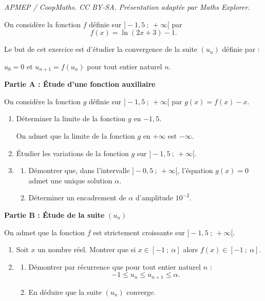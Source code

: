 \documentclass[10pt]{article}
\begin{document}
\noindent\textit{APMEP / CoopMaths. CC BY-SA. Présentation adaptée par Maths Explorer.}\par\medskip
\medskip

On considère la fonction $f$ définie sur $]-1,5~;~ +\infty[$ par 
\[f(x) = \ln (2x + 3) - 1.\]

Le but de cet exercice est d'étudier la convergence de la suite $\left(u_n\right)$ définie par  :
\begin{center}
$u_0 = 0$ et $u_{n+1}  = f\left(u_n\right)$ pour tout entier naturel $n$.\end{center}

\bigskip

\textbf{Partie A : Étude d'une fonction auxiliaire}

\medskip

On considère la fonction $g$ définie sur $]-1,5~;~ +\infty[$ par $g(x) = f(x) - x$.

\medskip

\begin{enumerate}
\item Déterminer la limite de la fonction $g$ en $-1,5$.

On admet que la limite de la fonction $g$ en $+ \infty$ est $-\infty$.

\item Étudier les variations de la fonction $g$ sur $]-1,5~;~ +\infty[$.
\item 
	\begin{enumerate}
		\item Démontrer que, dans l'intervalle $]-0,5~;~ +\infty[$, l'équation $g(x) = 0$ admet une unique solution $\alpha$.
		\item Déterminer un encadrement de $\alpha$ d'amplitude $10^{-2}$.
	\end{enumerate}	
\end{enumerate}

\bigskip

\textbf{Partie B : Étude de la suite} \boldmath $\left(u_n\right)$\unboldmath

\medskip

On admet que la fonction $f$ est strictement croissante sur $]-1,5~;~ +\infty[$.

\medskip

\begin{enumerate}
\item Soit $x$ un nombre réel. Montrer que si $x \in [-1~;~\alpha]$ alors $f(x) \in  [-1~;~\alpha]$.
\item 
	\begin{enumerate}
		\item Démontrer par récurrence que pour tout entier naturel $n$ :
		\[ -1 \leqslant u_n \leqslant u_{n+1} \leqslant \alpha.\]
		\item En déduire que la suite $\left(u_n\right)$ converge.
	\end{enumerate}	
\end{enumerate}

\bigskip
\end{document}
